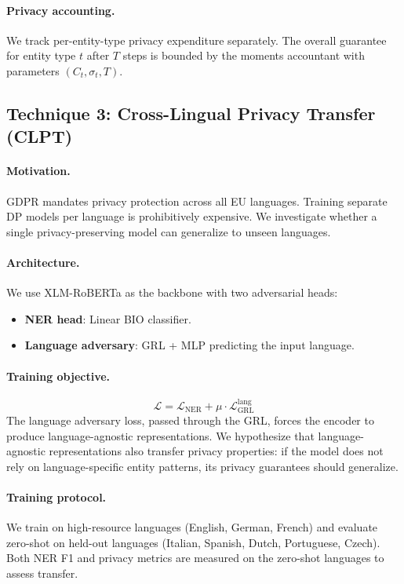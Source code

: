 \documentclass[11pt,a4paper]{article}
\begin{document}
\paragraph{Privacy accounting.}
We track per-entity-type privacy expenditure separately.  The overall guarantee
for entity type $t$ after $T$ steps is bounded by the moments accountant
\cite{abadi2016deep} with parameters $(C_t, \sigma_t, T)$.

\subsection{Technique 3: Cross-Lingual Privacy Transfer (CLPT)}
\label{sec:clpt}

\paragraph{Motivation.}
GDPR mandates privacy protection across all EU languages.  Training
separate DP models per language is prohibitively expensive.  We investigate
whether a single privacy-preserving model can generalize to unseen languages.

\paragraph{Architecture.}
We use XLM-RoBERTa \cite{conneau2020unsupervised} as the backbone with two
adversarial heads:
\begin{itemize}
    \item \textbf{NER head}: Linear BIO classifier.
    \item \textbf{Language adversary}: GRL + MLP predicting the input language.
\end{itemize}

\paragraph{Training objective.}
\begin{equation}
    \mathcal{L} = \mathcal{L}_{\text{NER}} + \mu \cdot \mathcal{L}_{\text{GRL}}^{\text{lang}}
\end{equation}
The language adversary loss, passed through the GRL, forces the encoder to
produce language-agnostic representations.  We hypothesize that language-agnostic
representations also transfer privacy properties: if the model does not rely
on language-specific entity patterns, its privacy guarantees should generalize.

\paragraph{Training protocol.}
We train on high-resource languages (English, German, French) and evaluate
zero-shot on held-out languages (Italian, Spanish, Dutch, Portuguese, Czech).
Both NER F1 and privacy metrics are measured on the zero-shot languages to
assess transfer.
\end{document}
